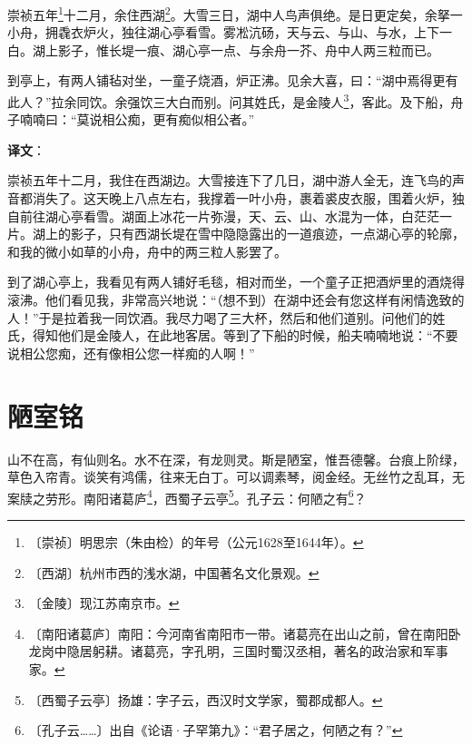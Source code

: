 \documentclass[12pt,UTF-8,openany]{ctexbook}
\begin{document}
\begin{normalsize}
    
    崇祯五年\footnote{〔崇祯〕明思宗（朱由检）的年号（公元1628至1644年）。}十二月，余住西湖\footnote{〔西湖〕杭州市西的浅水湖，中国著名文化景观。}。大雪三日，湖中人鸟声俱绝。是日更定矣，余拏一小舟，拥毳衣炉火，独往湖心亭看雪。雾凇沆砀，天与云、与山、与水，上下一白。湖上影子，惟长堤一痕、湖心亭一点、与余舟一芥、舟中人两三粒而已。
    
    到亭上，有两人铺毡对坐，一童子烧酒，炉正沸。见余大喜，曰：“湖中焉得更有此人？”拉余同饮。余强饮三大白而别。问其姓氏，是金陵人\footnote{〔金陵〕现江苏南京市。}，客此。及下船，舟子喃喃曰：“莫说相公痴，更有痴似相公者。”
\end{normalsize}


\newpage

\textbf{译文}：

\vspace{1em}

\begin{normalsize}
    
    崇祯五年十二月，我住在西湖边。大雪接连下了几日，湖中游人全无，连飞鸟的声音都消失了。这天晚上八点左右，我撑着一叶小舟，裹着裘皮衣服，围着火炉，独自前往湖心亭看雪。湖面上冰花一片弥漫，天、云、山、水混为一体，白茫茫一片。湖上的影子，只有西湖长堤在雪中隐隐露出的一道痕迹，一点湖心亭的轮廓，和我的微小如草的小舟，舟中的两三粒人影罢了。
    
    到了湖心亭上，我看见有两人铺好毛毯，相对而坐，一个童子正把酒炉里的酒烧得滚沸。他们看见我，非常高兴地说：“（想不到）在湖中还会有您这样有闲情逸致的人！”于是拉着我一同饮酒。我尽力喝了三大杯，然后和他们道别。问他们的姓氏，得知他们是金陵人，在此地客居。等到了下船的时候，船夫喃喃地说：“不要说相公您痴，还有像相公您一样痴的人啊！”
    
\end{normalsize}



\chapter{陋室铭}

\begin{normalsize}
    
    山不在高，有仙则名。水不在深，有龙则灵。斯是陋室，惟吾德馨。台痕上阶绿，草色入帘青。谈笑有鸿儒，往来无白丁。可以调素琴，阅金经。无丝竹之乱耳，无案牍之劳形。南阳诸葛庐\footnote{〔南阳诸葛庐〕南阳：今河南省南阳市一带。诸葛亮在出山之前，曾在南阳卧龙岗中隐居躬耕。诸葛亮，字孔明，三国时蜀汉丞相，著名的政治家和军事家。}，西蜀子云亭\footnote{〔西蜀子云亭〕扬雄：字子云，西汉时文学家，蜀郡成都人。}。孔子云：何陋之有\footnote{〔孔子云……〕出自《论语·子罕第九》：“君子居之，何陋之有？”}？
\end{normalsize}
\end{document}
